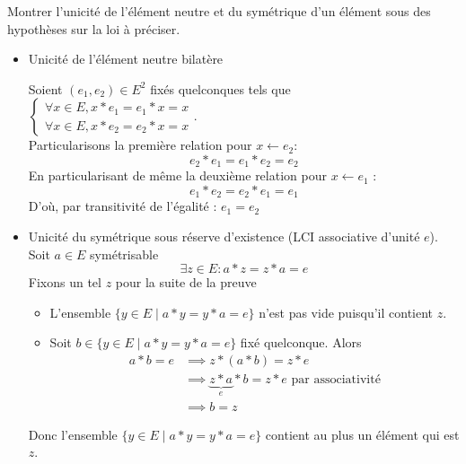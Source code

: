\documentclass{article}
\renewenvironment{question_kholle}[2][ ]
{
	\subsection{\texorpdfstring{#2}{}}
	\notblank{#1}
	{
		\noindent #1
		\bigbreak
	}
	{}
	\begin{proof}
}
{
	\end{proof}
}
\begin{document}
\begin{question_kholle}{Montrer l'unicité de l'élément neutre et du symétrique d'un élément sous des hypothèses sur la loi à préciser.}
  \;\\
  \begin{itemize}[label=$\lozenge$]
    \item Unicité de l'élément neutre bilatère

          Soient $(e_{1}, e_{2}) \in E^{2}$ fixés quelconques tels que $\left\{ \begin{array}{ll} \forall x \in E, x * e_{1} = e_{1} * x = x \\ \forall x \in E, x*e_{2}=e_{2}*x = x\end{array}\right.$.\\
          Particularisons la première relation pour $x \leftarrow e_{2}$:
          $$
            e_{2}*e_{1} = e_{1}*e_{2} = e_{2}
          $$
          En particularisant de même la deuxième relation pour $x \leftarrow e_{1}$ :
          $$
            e_{1}*e_{2} = e_{2}*e_{1} = e_{1}
          $$
          D'où, par transitivité de l'égalité : $e_{1} = e_{2}$

    \item Unicité du symétrique sous réserve d'existence (LCI associative d'unité $e$).\\
          Soit $a \in E$ symétrisable
          $$
            \exists z \in E : a * z = z*a = e
          $$
          Fixons un tel $z$ pour la suite de la preuve
          \begin{itemize}
            \item L'ensemble $\{ y \in E \mid a * y = y * a = e \}$ n'est pas vide puisqu'il contient $z$.

            \item Soit $b \in \{ y \in E \mid a * y = y * a = e \}$ fixé quelconque.
                  Alors
                  \begin{align*}
                    a * b = e & \implies z * ( a * b ) = z * e                                          \\
                              & \implies \underbrace{ z*a }_{ e } * b = z * e \text{ par associativité} \\
                              & \implies b = z
                  \end{align*}
          \end{itemize}
          Donc l'ensemble $\{ y \in E \mid a * y = y * a = e \}$ contient au plus un élément qui est $z$.
  \end{itemize}
\end{question_kholle}
\end{document}
